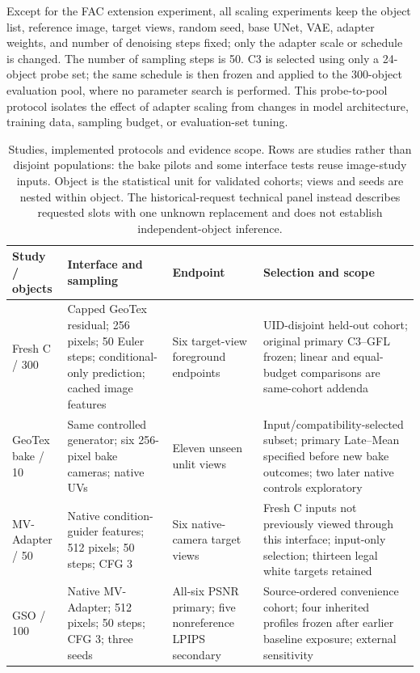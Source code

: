 \documentclass[times,twocolumn,final]{elsarticle}
\providecommand{\DIFdel}[1]{{\protect\color{red} \scriptsize #1}} %
\providecommand{\DIFaddbegin}{} %
\providecommand{\DIFdelbegin}{} %
\providecommand{\DIFdelend}{} %
\begin{document}
\DIFdelbegin \DIFdel{Except for the FAC extension experiment, all scaling experiments keep the object list, reference image, target views, random seed, base UNet, VAE, adapter weights, and number of denoising steps fixed; only the adapter scale or schedule is changed. The number of sampling steps is 50. C3 is selected using only a 24-object probe set; the same schedule is then frozen and applied to the 300-object evaluation pool, where no parameter search is performed. This probe-to-pool protocol isolates the effect of adapter scaling from changes in model architecture, training data, sampling budget, or evaluation-set tuning. }\DIFdelend \DIFaddbegin \begin{table}[t]
\centering\scriptsize\setlength{\tabcolsep}{3pt}
\caption{Studies, implemented protocols and evidence scope. Rows are studies rather than disjoint populations: the bake pilots and some interface tests reuse image-study inputs. Object is the statistical unit for validated cohorts; views and seeds are nested within object. The historical-request technical panel instead describes requested slots with one unknown replacement and does not establish independent-object inference.}
\label{tab:study-design}
\begin{tabular}{p{}p{}p{}p{}}
\toprule Study / objects & Interface and sampling & Endpoint & Selection and scope \\
\midrule
Fresh C / 300 & Capped GeoTex residual; 256 pixels; 50 Euler steps; conditional-only prediction; cached image features & Six target-view foreground endpoints & UID-disjoint held-out cohort; original primary C3--GFL frozen; linear and equal-budget comparisons are same-cohort addenda \\
GeoTex bake / 10 & Same controlled generator; six 256-pixel bake cameras; native UVs & Eleven unseen unlit views & Input/compatibility-selected subset; primary Late--Mean specified before new bake outcomes; two later native controls exploratory \\
MV-Adapter / 50 & Native condition-guider features; 512 pixels; 50 steps; CFG 3 & Six native-camera target views & Fresh C inputs not previously viewed through this interface; input-only selection; thirteen legal white targets retained \\
GSO / 100 & Native MV-Adapter; 512 pixels; 50 steps; CFG 3; three seeds & All-six PSNR primary; five nonreference LPIPS secondary & Source-ordered convenience cohort; four inherited profiles frozen after earlier baseline exposure; external sensitivity \\

\end{tabular}
\end{table}
\end{document}
